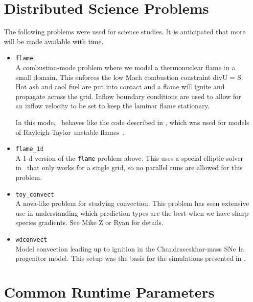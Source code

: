 \section{Distributed Science Problems}

The following problems were used for science studies.  It is
anticipated that more will be made available with time.

\begin{itemize}

\item {\tt flame} \\[-3mm]

   A combustion-mode problem where we model a thermonuclear flame in a
   small domain.  This enforces the low Mach combustion constraint
   div{U} = S.  Hot ash and cool fuel are put into contact and a flame
   will ignite and propagate across the grid.  Inflow boundary
   conditions are used to allow for an inflow velocity to be set to
   keep the laminar flame stationary.

   In this mode, \maestro\ behaves like the code described
   in \cite{SNe}, which was used for models of Rayleigh-Taylor
   unstable flames~\cite{SNld,SNrt,SNrt3d}.

\item {\tt flame\_1d} \\[-3mm]

   A 1-d version of the {\tt flame} problem above.  This uses a special
   elliptic solver in \boxlib\ that only works for a single grid, so
   no parallel runs are allowed for this problem.
   
\item {\tt toy\_convect} \\[-3mm]

A nova-like problem for studying convection.  This problem has seen
extensive use in understanding which prediction types are the best
when we have sharp species gradients.  See Mike Z or Ryan for details.

\item {\tt wdconvect} \\[-3mm]

Model convection leading up to ignition in the Chandraseskhar-mass SNe
Ia progenitor model.  This setup was the basis for the simulations
presented in \cite{lowMach4,wdconvect,wdturb}.


\end{itemize}


\section{Common Runtime Parameters}
\label{sec:gettingstarted:runtime}

